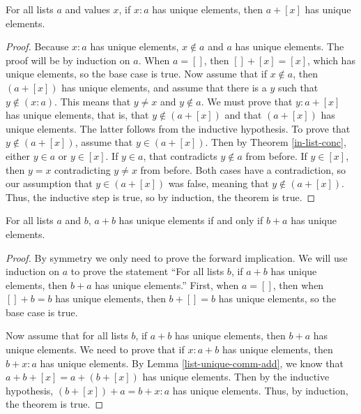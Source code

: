 \documentclass[../math.tex]{subfiles}
\begin{document}
\begin{lemma} \label{list-unique-comm-add}
    For all lists $a$ and values $x$, if $x : a$ has unique elements, then $a +
    [x]$ has unique elements.
\end{lemma}
\begin{proof}
    Because $x : a$ has unique elements, $x \notin a$ and $a$ has unique
    elements.  The proof will be by induction on $a$.  When $a = []$, then $[] +
    [x] = [x]$, which has unique elements, so the base case is true.  Now assume
    that if $x \notin a$, then $(a + [x])$ has unique elements, and assume that
    there is a $y$ such that $y \notin (x : a)$.  This means that $y \neq x$ and
    $y \notin a$.  We must prove that $y : a + [x]$ has unique elements, that
    is, that $y \notin (a + [x])$ and that $(a + [x])$ has unique elements.  The
    latter follows from the inductive hypothesis.  To prove that $y \notin (a +
    [x])$, assume that $y \in (a + [x])$.  Then by Theorem \ref{in-list-conc},
    either $y \in a$ or $y \in [x]$.  If $y \in a$, that contradicts $y \notin
    a$ from before.  If $y \in [x]$, then $y = x$ contradicting $y \neq x$ from
    before.  Both cases have a contradiction, so our assumption that $y \in (a +
    [x])$ was false, meaning that $y \notin (a + [x])$.  Thus, the inductive
    step is true, so by induction, the theorem is true.
\end{proof}

\begin{theorem} \label{list-unique-comm}
    For all lists $a$ and $b$, $a + b$ has unique elements if and only if $b +
    a$ has unique elements.
\end{theorem}
\begin{proof}
    By symmetry we only need to prove the forward implication.  We will use
    induction on $a$ to prove the statement ``For all lists $b$, if $a + b$ has
    unique elements, then $b + a$ has unique elements.''  First, when $a = []$,
    then when $[] + b = b$ has unique elements, then $b + [] = b$ has unique
    elements, so the base case is true.

    Now assume that for all lists $b$, if $a + b$ has unique elements, then $b +
    a$ has unique elements.  We need to prove that if $x : a + b$ has unique
    elements, then $b + x : a$ has unique elements.  By Lemma
    \ref{list-unique-comm-add}, we know that $a + b + [x] = a + (b + [x])$ has
    unique elements.  Then by the inductive hypothesis, $(b + [x]) + a = b + x :
    a$ has unique elements.  Thus, by induction, the theorem is true.
\end{proof}
\end{document}
